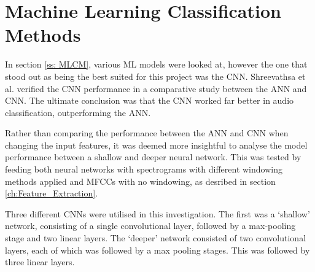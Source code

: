 \documentclass[class=report,11pt,crop=false]{standalone}
\begin{document}
\ifstandalone
\tableofcontents
\fi
\section{Machine Learning Classification Methods \label{ch:ML_Methods}}




In section \ref{ss: MLCM}, various ML models were looked at, however the one that stood out as being the best suited for this project was the CNN. Shreevathsa et al. \cite{Shreevathsa_2020} verified the CNN performance in a comparative study between the ANN and CNN. The ultimate conclusion was that the CNN worked far better in audio classification, outperforming the ANN. 

Rather than comparing the performance between the ANN and CNN when changing the input features, it was deemed more insightful to analyse the model performance between a shallow and deeper neural network. This was tested by feeding both neural networks with spectrograms with different windowing methods applied and MFCCs with no windowing, as desribed in section \ref{ch:Feature_Extraction}. 

Three different CNNs were utilised in this investigation. The first was a `shallow' network, consisting of a single convolutional layer, followed by a max-pooling stage and two linear layers. The `deeper' network consisted of two convolutional layers, each of which was followed by a max pooling stages. This was followed by three linear layers. 
\end{document}
